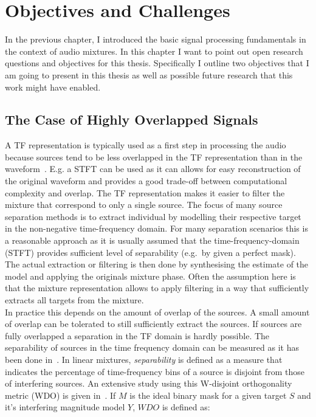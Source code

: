 \hypertarget{objectives-and-challenges}{%
\chapter{Objectives and Challenges}\label{objectives-and-challenges}}

In the previous chapter, I introduced the basic signal processing fundamentals in the context of audio mixtures.
In this chapter I want to point out open research questions and objectives for this thesis.
Specifically I outline two objectives that I am going to present in this thesis as well as possible future research that this work might have enabled.

\hypertarget{highly-overlapped-signals}{%
\section{The Case of Highly Overlapped Signals}\label{highly-overlapped-signals}}

A TF representation is typically used as a first step in processing the audio because sources tend to be less overlapped in the TF representation than in the waveform~\cite{rickard02, giannoulis11}.
E.g. a STFT can be used as it can allows for easy reconstruction of the original waveform and provides a good trade-off between computational complexity and overlap.
The TF representation makes it easier to filter the mixture that correspond to only a single source.
The focus of many source separation methods is to extract individual by modelling their respective target in the non-negative
time-frequency domain.
For many separation scenarios this is a reasonable approach as it is usually assumed that the time-frequency-domain (STFT) provides sufficient level of separability (e.g.~by given a perfect mask).
The actual extraction or filtering is then done by synthesising the estimate of the model and applying the originals mixture phase.
Often the assumption here is that the mixture representation allows to apply filtering in a way that sufficiently extracts all targets from the mixture.
\\

In practice this depends on the amount of overlap of the sources.
A small amount of overlap can be tolerated to still sufficiently extract the sources.
If sources are fully overlapped a separation in the TF domain is hardly possible.
The separability of sources in the time frequency domain can be measured as it has been done in~\cite{rickard02, giannoulis11}.
In linear mixtures, \emph{separability} is defined as a measure that indicates the percentage of time-frequency bins of a source is disjoint from those of interfering sources.
An extensive study using this W-disjoint orthogonality metric (WDO) is given in~\cite{rickard02}.
If \(M\) is the ideal binary mask for a given target \(S\) and it's interfering
magnitude model \(Y\), \(WDO\) is defined as:

